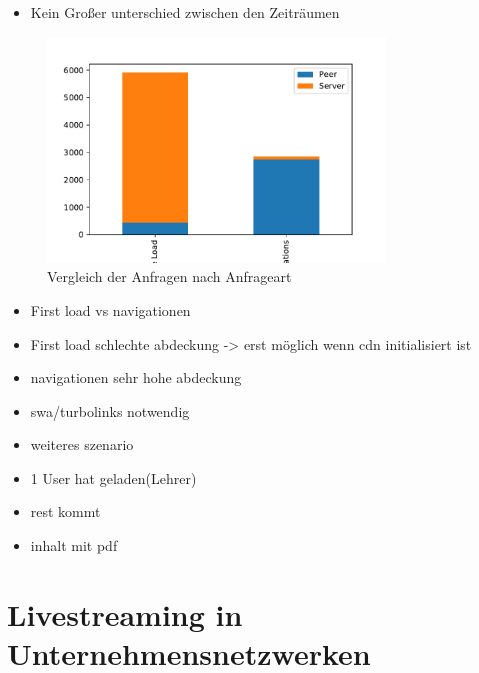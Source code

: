 \begin{itemize}
	\item Kein Großer unterschied zwischen den Zeiträumen
\end{itemize}

\begin{figure}[!h]
	\centering
	\includegraphics[width=0.8\textwidth]{figures/sc_first_vs_later}
	\caption[A Figure Short-Title]{Vergleich der Anfragen nach Anfrageart}
	\label{fig:15_clients_network}
\end{figure}

\begin{itemize}
	\item First load vs navigationen
	\item First load schlechte abdeckung -> erst möglich wenn cdn initialisiert ist
	\item navigationen sehr hohe abdeckung
	\item swa/turbolinks notwendig
\end{itemize}


\begin{itemize}
	\item weiteres szenario 
	\item 1 User hat geladen(Lehrer)
	\item rest kommt
	\item inhalt mit pdf

\end{itemize}

\section{Livestreaming in Unternehmensnetzwerken}

